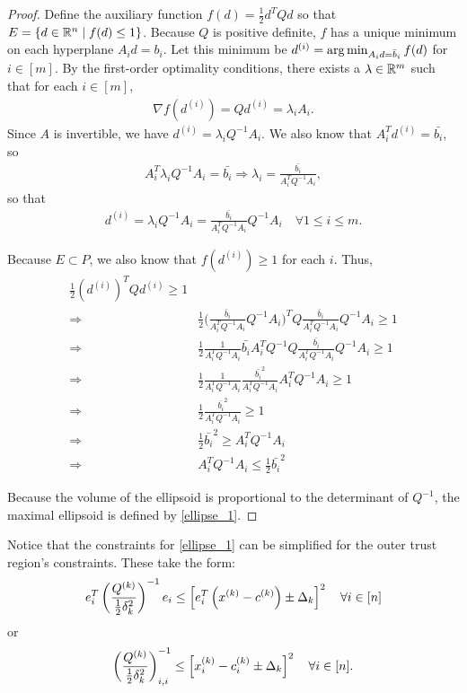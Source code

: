 \begin{proof}
Define the auxiliary function $f(d) = \frac 1 2 d^T Q d$ so that $E = \{ d \in \mathbb R^n\; | \; f(d) \le 1 \}$.
Because $Q$ is positive definite, $f$ has a unique minimum on each hyperplane $A_i d = b_i$.
Let this minimum be $d^{(i)} = \operatorname*{arg\,min}_{A_id =\bar{b}_i} f(d)$ for $i\in[m]$.
By the first-order optimality conditions, there exists a $\lambda \in \mathbb R^m$ such that for each $i\in[m]$,
\begin{align*}
\nabla f(d^{(i)}) = Q d^{(i)} = \lambda_i A_i.
\end{align*}
Since $A$ is invertible, we have $d^{(i)} = \lambda_i Q^{-1}A_i$. 
We also know that $A_i^T d^{(i)} = \bar{b_i}$, so 
\begin{align*}
A_i^T \lambda_i Q^{-1}A_i = \bar{b_i} \Longrightarrow
\lambda_i = \frac {\bar{b_i}}{A_i^T  Q^{-1}A_i},
\end{align*}
so that
\begin{align*}
d^{(i)} = \lambda_i Q^{-1}A_i = \frac {\bar{b_i}}{A_i^T  Q^{-1}A_i}  Q^{-1}A_i \quad \forall 1\le i\le m.
\end{align*}

Because $E \subset P$, we also know that $f(d^{(i)}) \ge 1$ for each $i$. Thus,
\begin{align*}
\frac 1 2 (d^{(i)})^{T} Q d^{(i)} \ge 1 \\
\Longrightarrow & \frac 1 2 \bigg(\frac {\bar{b}_i}{A_i^T  Q^{-1}A_i}  Q^{-1}A_i\bigg)^{T} Q \frac {\bar{b}_i}{A_i^T  Q^{-1}A_i}  Q^{-1}A_i \ge 1 \\
\Longrightarrow & \frac 1 2 \frac {1}{A_i^T  Q^{-1}A_i}  \bar{b_i} A_i^T Q^{-1} Q \frac {\bar{b_i}}{A_i^T  Q^{-1}A_i}  Q^{-1}A_i \ge 1 \\
\Longrightarrow & \frac 1 2 \frac {1}{A_i^T  Q^{-1}A_i}  \frac {\bar{b_i}^2}{A_i^T  Q^{-1}A_i}  A_i^T Q^{-1}A_i \ge 1 \\
\Longrightarrow & \frac 1 2  \frac {\bar{b_i}^2}{A_i^T  Q^{-1}A_i} \ge 1 \\
\Longrightarrow & \frac 1 2 \bar{b_i}^2\ge A_i^T  Q^{-1}A_i \\
\Longrightarrow & A_i^T  Q^{-1}A_i \le \frac 1 2 \bar{b_i}^2
\end{align*}

Because the volume of the ellipsoid is proportional to the determinant of $Q^{-1}$, the maximal ellipsoid is defined by \cref{ellipse_1}.
\end{proof}


Notice that the constraints for \cref{ellipse_1} can be simplified for the outer trust region's constraints.
These take the form:
\begin{align*}
e_i^T\left(\frac{{Q^{(k)}}}{\frac 1 2 \delta_k^2}\right)^{-1} e_i \le \left[e_i^T\left(x^{(k)} - c^{(k)}\right) \pm \Delta_k \right]^2 \quad \forall i \in [n]
\end{align*}
or
\begin{align}
\label{ellipsoids_trust_region_constraints}
\left(\frac{{Q^{(k)}}}{\frac 1 2 \delta_k^2}\right)_{i,i}^{-1} \le \left[x_i^{(k)} - c^{(k)}_i \pm \Delta_k \right]^2 \quad \forall i \in [n].
\end{align}


